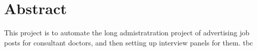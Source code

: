 \section*{\centering Abstract}
This project is to automate the long admistratration project of advertising job posts for consultant doctors, and then setting up interview panels for them. tbc